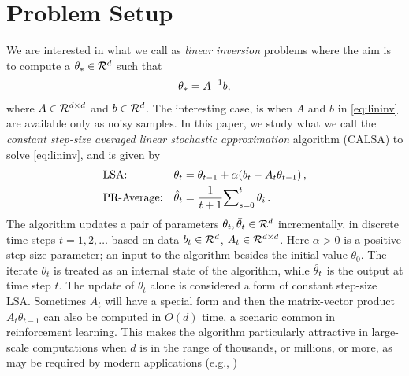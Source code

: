 \section{Problem Setup}\label{sec:prob}
We are interested in what we call as \emph{linear inversion} problems where the aim is to compute a $\theta_*\in \mathcal{R}^d$ such that
\begin{align}\label{eq:lininv}
\theta_*=A^{-1}b,
\end{align}
where $A\in \mathcal{R}^{d \times d}$ and $b\in \mathcal{R}^{d}$. The interesting case, is when $A$ and $b$ in \eqref{eq:lininv} are available only as noisy samples. In this paper, we study what we call the \emph{constant step-size averaged linear stochastic approximation} algorithm (CALSA) to solve \eqref{eq:lininv}, and is given by
\begin{subequations}\label{eq:lsa}
\begin{align}
\label{conststep}&\text{LSA:} &\theta_t&=\theta_{t-1}+\alpha(b_t-A_t\theta_{t-1})\,,\\
\label{iteravg}&\text{PR-Average:} &\hat{\theta}_t&=\frac{1}{t+1}{\sum}_{s=0}^{t}\,\theta_i\,.
\end{align}
\end{subequations}
The algorithm updates a pair of parameters $\theta_t,\bar{\theta}_t\in \mathcal{R}^{d}$ incrementally, in discrete time steps $t=1,2,\dots$
based on data $b_t\in \mathcal{R}^d$, $A_t\in \mathcal{R}^{d \times d}$. Here $\alpha>0$ is a positive step-size parameter; an input to the algorithm besides the
initial value $\theta_0$. The iterate $\theta_t$ is treated as an internal state of the algorithm, while $\hat{\theta}_t$ is the output at time step $t$. The update of $\theta_t$ alone is considered a form of constant step-size LSA. Sometimes $A_t$ will have a special form and then the matrix-vector product $A_t \theta_{t-1}$ can also be computed in $O(d)$ time, a scenario common in reinforcement learning\cite{sutton,konda-tsitsiklis,gtd,gtd2,gtdmp}. This makes the algorithm particularly attractive in large-scale computations when $d$ is in the range of thousands, or millions, or more, as may be required by modern applications (e.g., \citep{LiMaTaBo16})
\begin{comment}
Note that the computation of $\theta_t$ can also be performed in an incremental fashion using $O(d)$ storage. 
Moreover, sometimes $A_t$ will have a special form and then the matrix-vector product $A_t \theta_{t-1}$ can also be computed in $O(d)$ time. This happens for example when $A_t$ is rank one.
When the data $(b_t,A_t)$ is sparse, further speedups are possible.
Examples of this kind arise in reinforcement learning \cite{sutton,konda-tsitsiklis,gtd,gtd2,gtdmp}, 
for details see \Cref{sec:related}.
The significance of efficient computation of the matrix-vector product is that an update of the algorithm
can then be implemented in $O(d)$ time (or less, in case of sparse data) and $O(d)$ storage, which makes the algorithm particularly attractive in large-scale computations when $d$ is in the range of thousands, or millions, or more, as may be required by modern applications (e.g., \citep{LiMaTaBo16})
\end{comment}

